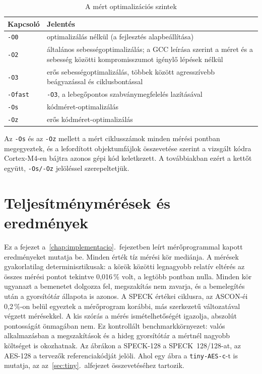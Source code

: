 \documentclass[a4paper,12pt]{report}
\theoremstyle{definition}
\theoremstyle{remark}
\begin{document}
\begin{table}[htbp]
    \centering
    \small
    \caption{A mért optimalizációs szintek}
    \label{tab:build_config}
    \begin{tabular}{|l|p{11cm}|}
        \hline
        \textbf{Kapcsoló} & \textbf{Jelentés} \\ \hline
        \texttt{-O0} & optimalizálás nélkül (a fejlesztés alapbeállítása) \\ \hline
        \texttt{-O2} & általános sebességoptimalizálás; a GCC leírása szerint a méret és a sebesség közötti kompromisszumot igénylő lépések nélkül \\ \hline
        \texttt{-O3} & erős sebességoptimalizálás, többek között agresszívebb beágyazással és ciklusbontással \\ \hline
        \texttt{-Ofast} & \texttt{-O3}, a lebegőpontos szabványmegfelelés lazításával \\ \hline
        \texttt{-Os} & kódméret-optimalizálás \\ \hline
        \texttt{-Oz} & erős kódméret-optimalizálás \\ \hline
    \end{tabular}
\end{table}

Az \texttt{-Os} és az \texttt{-Oz} mellett a mért ciklusszámok minden mérési pontban megegyeztek, és a lefordított objektumfájlok összevetése szerint a vizsgált kódra Cortex-M4-en bájtra azonos gépi kód keletkezett. A továbbiakban ezért a kettőt együtt, \texttt{-Os/-Oz} jelöléssel szerepeltetjük.

\chapter{Teljesítménymérések és eredmények}\label{chap:meresek}

Ez a fejezet a~\ref{chap:implementacio}.~fejezetben leírt mérőprogrammal kapott eredményeket mutatja be. Minden érték tíz mérési kör mediánja. A mérések gyakorlatilag determinisztikusak: a körök közötti legnagyobb relatív eltérés az összes mérési pontot tekintve 0,016\,\% volt, a legtöbb pontban nulla. Minden kör ugyanazt a bemenetet dolgozza fel, megszakítás nem zavarja, és a bemelegítés után a gyorsítótár állapota is azonos. A SPECK értékei ciklusra, az ASCON-éi 0,2\,\%-on belül egyeztek a mérőprogram korábbi, más szerkezetű változatával végzett mérésekkel. A kis szórás a mérés ismételhetőségét igazolja, abszolút pontosságát önmagában nem. Ez kontrollált benchmarkkörnyezet: valós alkalmazásban a megszakítások és a hideg gyorsítótár a mértnél nagyobb költséget is okozhatnak. Az ábrákon a SPECK-128 a SPECK~128/128-at, az AES-128 a tervezők referenciakódját jelöli. Ahol egy ábra a \texttt{tiny-AES-c}-t is mutatja, az az~\ref{sec:tiny}.~alfejezet összevetéséhez tartozik.
\end{document}
